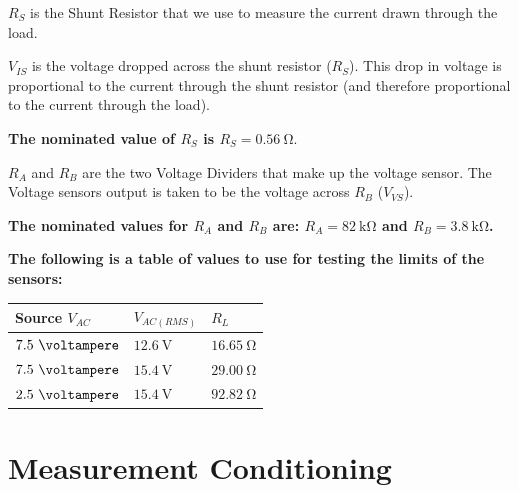 \documentclass[a4paper,12pt]{article}
\begin{document}
\vspace{7mm}

$R_S$ is the Shunt Resistor that we use to measure the current drawn through the load. 

${V_{IS}}$  is the voltage dropped across the shunt resistor ($R_{S}$). 
This drop in voltage is proportional to the current through the shunt resistor 
(and therefore proportional to the current through the load). \medskip

\textbf{The nominated value of $R_S$ is $R_S = 0.56\ \si{\ohm}$}. \medskip


$R_A$ and $R_B$ are the two Voltage Dividers that make up the voltage sensor.
The Voltage sensors output is taken to be the voltage across $R_B$ ($V_{VS}$). \medskip

\textbf{
	The nominated values for $R_A$ and $R_B$ are:
	$R_A = 82\ \si{\kilo\ohm}$ and $R_B = 3.8\ \si{\kilo\ohm}$.
} \medskip


\textbf{The following is a table of values to use for testing the limits of the sensors:}
\medskip

\begin{table}[H]
 \centering
 \renewcommand\arraystretch{2}
 \begin{tabular}{p{4cm} p{4cm} p{2cm}}

 \toprule
 Source $V_{AC}$ & $V_{AC(RMS)}$ & $R_L$ \\
 \toprule
 $7.5\ \si{\voltampere}$ & $12.6\ \si{\volt}$ & $16.65\ \si{\ohm}$ \\
 $7.5\ \si{\voltampere}$ & $15.4\ \si{\volt}$ & $29.00\ \si{\ohm}$ \\
 $2.5\ \si{\voltampere}$ & $15.4\ \si{\volt}$ & $92.82\ \si{\ohm}$ \\
 \bottomrule
 \end{tabular}
\end{table}


\clearpage

\section{Measurement Conditioning}

\vspace{5mm}
\end{document}
